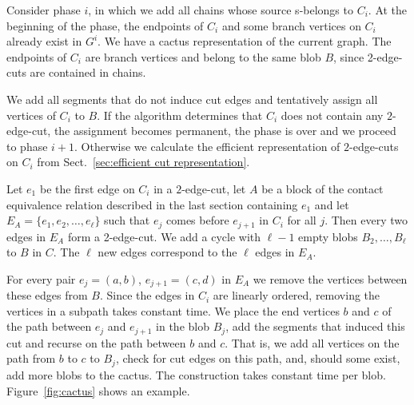 \documentclass[paper=a4]{scrartcl}
\newcommand{\sset}[1]{\{ #1 \}}
\begin{document}
Consider phase $i$, in which we add all chains whose source s-belongs to $C_i$. At the beginning of the phase, the endpoints of $C_i$ and some branch vertices on $C_i$ already exist in $G^i$. We have a cactus representation of the current graph. The endpoints of $C_i$ are branch vertices and belong to the same blob $B$, since 2-edge-cuts are contained in chains.

We add all segments that do not induce cut edges and tentatively assign all vertices of $C_i$ to $B$. If the algorithm determines that $C_i$ does not contain any $2$-edge-cut, the assignment becomes permanent, the phase is over and we proceed to phase $i+1$. Otherwise we calculate the efficient representation of $2$-edge-cuts on $C_i$ from Sect.~\ref{sec:efficient cut representation}.

Let $e_1$ be the first edge on $C_i$ in a $2$-edge-cut, let $A$ be a block of the contact equivalence relation described in the last section containing $e_1$ and let $E_A = \sset{e_1,e_2,\ldots,e_\ell}$ such that $e_j$ comes before $e_{j+1}$ in $C_i$ for all $j$. Then every two edges in $E_A$ form a 2-edge-cut. We add a cycle with $\ell-1$ empty blobs $B_2,\ldots,B_\ell$ to $B$ in $C$. The $\ell$ new edges correspond to the $\ell$ edges in $E_A$.

For every pair $e_j=(a,b)$, $e_{j+1}=(c,d)$ in $E_A$ we remove the vertices between these edges from $B$. Since the edges in $C_i$ are linearly ordered, removing the vertices in a subpath takes constant time. We place the end vertices $b$ and $c$ of the path between $e_j$ and $e_{j+1}$ in the blob $B_j$, add the segments that induced this cut and recurse on the path between $b$ and $c$. That is, we add all vertices on the path from $b$ to $c$ to $B_j$, check for cut edges on this path, and, should some exist, add more blobs to the cactus. The construction takes constant time per blob. Figure~\ref{fig:cactus} shows an example.
\end{document}
